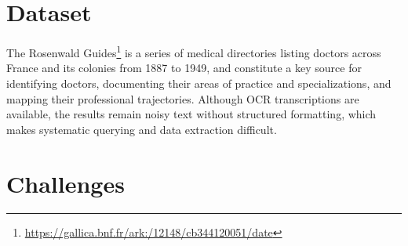 




\section{Dataset}
The Rosenwald Guides\footnote{\url{https://gallica.bnf.fr/ark:/12148/cb344120051/date}} is a series of medical directories listing doctors across France and its colonies from 1887 to 1949, and constitute a key source for identifying doctors, documenting their areas of practice and specializations, and mapping their professional trajectories. Although OCR transcriptions are available, the results remain noisy text without structured formatting, which makes systematic querying and data extraction difficult.


\section{Challenges}

